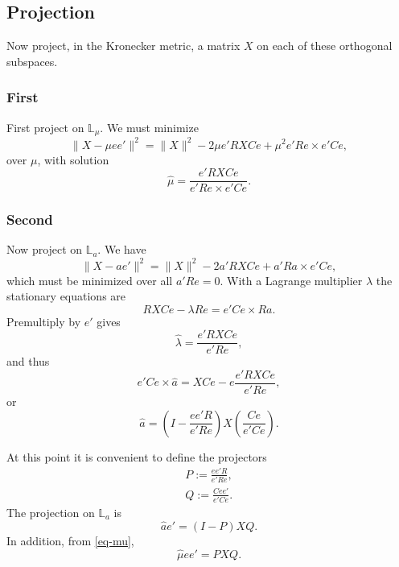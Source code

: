 \documentclass[
  12pt,
  letterpaper,
  DIV=11,
  numbers=noendperiod]{scrartcl}
\begin{document}
\subsection{Projection}\label{projection}

Now project, in the Kronecker metric, a matrix \(X\) on each of these
orthogonal subspaces.

\subsubsection{First}\label{first}

First project on \(\mathbb{L}_\mu\). We must minimize \begin{equation}
\|X-\mu ee'\|^2=\|X\|^2-2\mu e'RXCe+\mu^2e'Re\times e'Ce,
\end{equation} over \(\mu\), with solution \begin{equation}
\hat\mu=\frac{e'RXCe}{e'Re\times e'Ce}.\label{eq-mu}
\end{equation}

\subsubsection{Second}\label{second}

Now project on \(\mathbb{L}_a\). We have \begin{equation}
\|X-ae'\|^2=\|X\|^2-2a'RXCe+a'Ra\times e'Ce,
\end{equation} which must be minimized over all \(a'Re=0\). With a
Lagrange multiplier \(\lambda\) the stationary equations are
\begin{equation}
RXCe-\lambda Re=e'Ce\times Ra.
\end{equation} Premultiply by \(e'\) gives \begin{equation}
\hat\lambda=\frac{e'RXCe}{e'Re},
\end{equation} and thus \begin{equation}
e'Ce\times\hat a=XCe-e\frac{e'RXCe}{e'Re},\label{eq-asolve}
\end{equation} or \begin{equation}
\hat a=\left(I-\frac{ee'R}{e'Re}\right)X\left(\frac{Ce}{e'Ce}\right).
\end{equation}

At this point it is convenient to define the projectors \begin{align}
P:=\frac{ee'R}{e'Re},\label{eq-pdef}\\
Q:=\frac{Cee'}{e'Ce}.\label{eq-qdef}
\end{align} The projection on \(\mathbb{L}_a\) is \begin{equation}
\hat ae'=(I-P)XQ.
\end{equation} In addition, from \eqref{eq-mu}, \begin{equation}
\hat\mu ee'=PXQ.
\end{equation}
\end{document}
